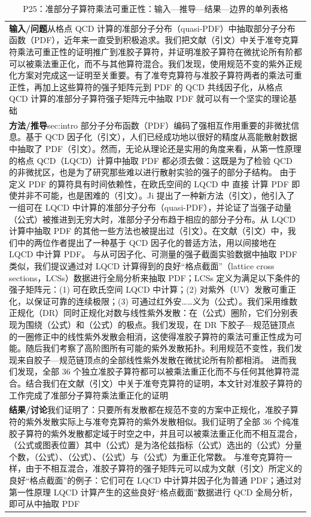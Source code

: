 \documentclass[UTF8,11pt,oneside]{ctexbook}
\begin{document}
\begin{table}[htbp]
  \centering
  \caption*{P25：准部分子算符乘法可重正性：输入—推导—结果—边界的单列表格}
  \small
  \begin{tabular}{@{}p{}@{}}
    \toprule
    \textbf{输入/问题}\quad 从格点 QCD 计算的准部分子分布（quasi-PDF）中抽取部分子分布函数（PDF），近年来一直受到积极追求。我们把文献（引文）中关于准夸克算符乘法可重正性的证明推广到准胶子算符，并证明准胶子算符在微扰论所有阶都可以被乘法重正化，而不与其他算符混合。我们发现，使用规范不变的紫外正规化方案对完成这一证明至关重要。有了准夸克算符与准胶子算符两者的乘法可重正性，再加上这些算符的强子矩阵元到 PDF 的 QCD 共线因子化，从格点 QCD 计算的准部分子算符强子矩阵元中抽取 PDF 就可以有一个坚实的理论基础 \\
    \textbf{方法/推导}\quad sec:intro 部分子分布函数（PDF）编码了强相互作用重要的非微扰信息。基于 QCD 因子化（引文），人们已经成功地以很好的精度从高能散射数据中抽取了 PDF（引文）。然而，无论从理论还是实用的角度来看，从第一性原理的格点 QCD（LQCD）计算中抽取 PDF 都必须去做：这既是为了检验 QCD 的非微扰区，也是为了研究那些难以进行散射实验的强子的部分子结构。 由于定义 PDF 的算符具有时间依赖性，在欧氏空间的 LQCD 中 直接 计算 PDF 即使并非不可能，也是困难的（引文）。Ji 提出了一种新方法（引文），他引入了一组可在 LQCD 中计算的准部分子分布（quasi-PDF），并论证了当强子动量（公式）被推进到无穷大时，准部分子分布趋于相应的部分子分布。从 LQCD 计算中抽取 PDF 的其他一些方法也被提出过（引文）。在文献（引文）中，我们中的两位作者提出了一种基于 QCD 因子化的普适方法，用以间接地在 LQCD 中计算 PDF。 与从可因子化、可测量的强子截面实验数据中抽取 PDF 类似，我们提议通过对 LQCD 计算得到的良好“格点截面”（lattice cross sections，LCSs）数据进行全局分析来抽取 PDF；LCSs 定义为满足以下条件的强子矩阵元：(1) 可在欧氏空间 LQCD 中计算；(2) 对紫外（UV）发散可重正化，以保证可靠的连续极限；(3) 可通过红外安……义为（公式）。我们采用维数正规化（DR）同时正规化对数与线性紫外发散：在（公式）圈阶，它们分别表现为围绕（公式）和（公式）的极点。我们发现，在 DR 下胶子—规范链顶点的一圈修正中的线性紫外发散会相消，这使得准胶子算符的乘法可重正性成为可能。随后我们考察了高阶图所有可能的紫外发散拓扑。利用规范不变性，我们发现来自胶子—规范链顶点的全部线性紫外发散在微扰论所有阶都相消。 进而我们发现，全部 36 个独立准胶子算符都可以被乘法重正化而不与任何其他算符混合。结合我们在文献（引文）中关于准夸克算符的证明，本文针对准胶子算符的工作完成了准部分子算符乘法重正化的证明 \\
    \textbf{结果/讨论}\quad 我们证明了：只要所有发散都在规范不变的方案中正规化，准胶子算符的紫外发散实际上与准夸克算符的紫外发散相似。我们证明了全部 36 个纯准胶子算符的紫外发散都定域于时空之中，并且可以被乘法重正化而不相互混合，（公式或图表位置）其中（公式）是为洛伦兹指标（公式）选出的（公式）分量个数，（公式）、（公式）、（公式）与（公式）为重正化常数。 与准夸克算符一样，由于不相互混合，准胶子算符的强子矩阵元可以成为文献（引文）所定义的良好“格点截面”的例子：它们可在 LQCD 中计算并因子化为普通 PDF；通过对第一性原理 LQCD 计算产生的这些良好“格点截面”数据进行 QCD 全局分析，即可从中抽取 PDF \\

\end{tabular}
\end{table}
\end{document}
